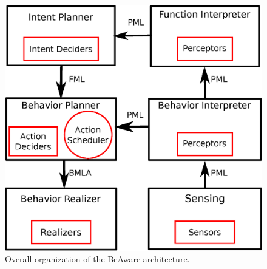 \documentclass[twocolumn]{svjour3}
\begin{document}
\begin{figure}
  \centering
  \includegraphics[width=\linewidth]{figure/impl_schema.eps}
  \caption{Overall organization of the BeAware architecture.}
  \label{overall_archi}
\end{figure}
\end{document}

